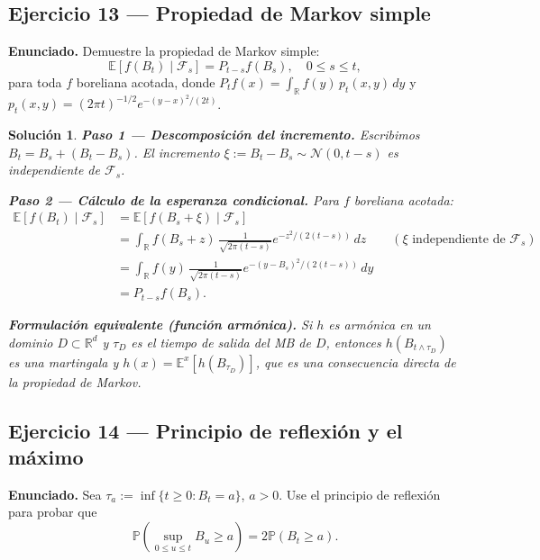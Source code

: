 \documentclass[12pt,letterpaper]{article}
\theoremstyle{ejercicio}
\theoremstyle{solucion}
\newtheorem*{solucion}{Solución}
\newcommand{\E}{\mathbb{E}}
\newcommand{\R}{\mathbb{R}}
\newcommand{\F}{\mathcal{F}}
\renewcommand{\P}{\mathbb{P}}
\begin{document}
\subsection*{Ejercicio 13 — Propiedad de Markov simple}

\begin{recuadro}
\textbf{Enunciado.} Demuestre la propiedad de Markov simple:
\[
  \E[f(B_t)\mid\F_s] = P_{t-s}f(B_s),\quad 0\le s\le t,
\]
para toda $f$ boreliana acotada, donde $P_t f(x)=\int_{\R}f(y)\,p_t(x,y)\,dy$ y
$p_t(x,y)=(2\pi t)^{-1/2}e^{-(y-x)^2/(2t)}$.
\end{recuadro}

\begin{solucion}

\textbf{Paso 1 — Descomposición del incremento.}
Escribimos $B_t = B_s + (B_t-B_s)$. El incremento $\xi:=B_t-B_s\sim\mathcal{N}(0,t-s)$
es independiente de $\F_s$.

\textbf{Paso 2 — Cálculo de la esperanza condicional.}
Para $f$ boreliana acotada:
\begin{align*}
  \E[f(B_t)\mid\F_s]
  &= \E[f(B_s+\xi)\mid\F_s]\\
  &= \int_{\R}f(B_s+z)\,\frac{1}{\sqrt{2\pi(t-s)}}e^{-z^2/(2(t-s))}\,dz
     \qquad(\text{$\xi$ independiente de }\F_s)\\
  &= \int_{\R}f(y)\,\frac{1}{\sqrt{2\pi(t-s)}}e^{-(y-B_s)^2/(2(t-s))}\,dy\\
  &= P_{t-s}f(B_s).
\end{align*}

\textbf{Formulación equivalente (función armónica).}
Si $h$ es armónica en un dominio $D\subset\R^d$ y $\tau_D$ es el tiempo de salida del
MB de $D$, entonces $h(B_{t\wedge\tau_D})$ es una martingala y
$h(x)=\E^x[h(B_{\tau_D})]$, que es una consecuencia directa de la propiedad de Markov.
\end{solucion}

\subsection*{Ejercicio 14 — Principio de reflexión y el máximo}

\begin{recuadro}
\textbf{Enunciado.} Sea $\tau_a:=\inf\{t\ge 0:B_t=a\}$, $a>0$. Use el principio de
reflexión para probar que
\[
  \P\!\left(\sup_{0\le u\le t}B_u\ge a\right)=2\P(B_t\ge a).
\]
\end{recuadro}
\end{document}
